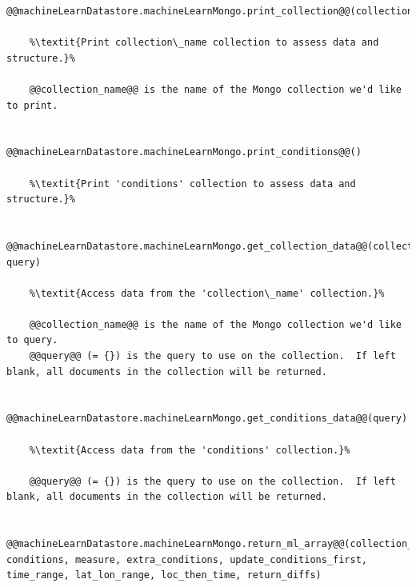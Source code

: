\begin{lstlisting}[style=codedef]
@@machineLearnDatastore.machineLearnMongo.print_collection@@(collection_name)
	
	%\textit{Print collection\_name collection to assess data and structure.}%

	@@collection_name@@ is the name of the Mongo collection we'd like to print.


@@machineLearnDatastore.machineLearnMongo.print_conditions@@()
	
	%\textit{Print 'conditions' collection to assess data and structure.}%


@@machineLearnDatastore.machineLearnMongo.get_collection_data@@(collection_name, query)
	
	%\textit{Access data from the 'collection\_name' collection.}%

	@@collection_name@@ is the name of the Mongo collection we'd like to query.
	@@query@@ (= {}) is the query to use on the collection.  If left blank, all documents in the collection will be returned.


@@machineLearnDatastore.machineLearnMongo.get_conditions_data@@(query)
	
	%\textit{Access data from the 'conditions' collection.}%

	@@query@@ (= {}) is the query to use on the collection.  If left blank, all documents in the collection will be returned.


@@machineLearnDatastore.machineLearnMongo.return_ml_array@@(collection_name, conditions, measure, extra_conditions, update_conditions_first, time_range, lat_lon_range, loc_then_time, return_diffs)
	

\end{lstlisting}
